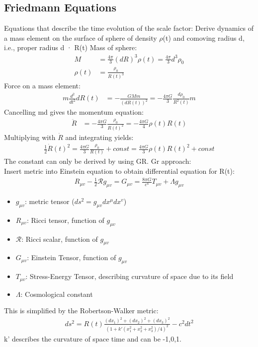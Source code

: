 \documentclass[11pt,a4paper]{article}
\begin{document}
\subsection{Friedmann Equations}
Equations that describe the time evolution of the scale factor:
Derive dynamics of a mass element on the surface of sphere of density $\rho$(t) and comoving
radius d, i.e., proper radius d · R(t)
Mass of sphere:
\begin{align*}
    M &= \frac {4 \pi} 3 (dR)^3 \rho (t) = \frac {4\pi} 3 d^3\rho_0 \\
    \rho(t) &= \frac {\rho_0}{R(t)^3}
\end{align*}
Force on a mass element:
\begin{align*}
    m \frac {d^2}{dt^2}d R(t) &= - \frac {GMm}{(dR(t))^2} = - \frac {4 \pi G}{3} \frac {d \rho_0}{R^2(t)} m 
\end{align*}
Cancelling md gives the momentum equation:
\begin{align*}
    \ddot R &= - \frac {4 \pi G} 3 \frac {\rho_0}{R(t)^2}= - \frac {4 \pi G} 4 \rho (t) R(t) 
\end{align*}
Multiplying with $\dot R$ and integrating yields:
\begin{align*}
    \frac 1 2 \dot R (t)^2 = \frac {4 \pi G} 3 \frac {\rho_0}{R(t)} + const =  \frac {4 \pi G} 3 \rho(t)R(t)^2 + const
\end{align*}
The constant can only be derived by using GR.
Gr approach: \\
Insert metric into Einstein equation to obtain differential equation for R(t):
\begin{align*}
    R_{\mu v} - \frac 1 2 \mathcal{R} g_{\mu v} = G_{\mu v} = \frac {8 \pi G}{c^4}T_{\mu v} + \Lambda g_{\mu v}
\end{align*}
\begin{itemize}
    \item $g_{\mu v}$: metric tensor ($ds^2=g_{\mu v} dx^\mu dx^v$)
    \item $R_{\mu v}$: Ricci tensor, function of $g_{\mu v}$
    \item $\mathcal R$: Ricci scalar, function of $g_{\mu v}$
    \item $G_{\mu v}$: Einstein Tensor, function of $g_{\mu v}$
    \item $T_{\mu v}$: Stress-Energy Tensor, describing curvature of space due to its field
    \item $\Lambda$: Cosmological constant
\end{itemize}
This is simplified by the Robertson-Walker metric:
\begin{align*}
    ds^2 = R(t)\frac{(dx_1)^2 + (dx_2)^2 + (dx_3)^2} {(1+k' (x_1^2 + x_2^2 + x_3^2)/4)^2} - c^2 dt^2 
\end{align*}
k' describes the curvature of space time and can be -1,0,1. 
\end{document}
